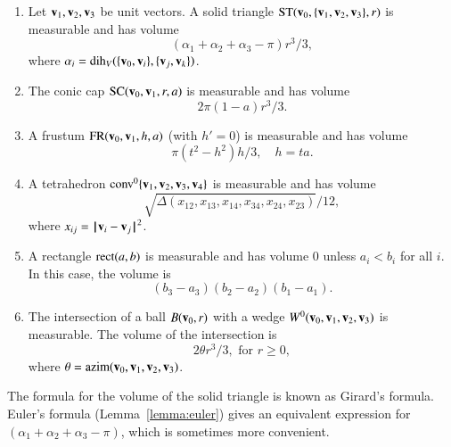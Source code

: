 \begin{lemma} 
\begin{enumerate} 
 \item {} Let ${\mathbf v}_1,{\mathbf v}_2,{\mathbf v}_3$ be unit vectors.
   A solid triangle ${\operatorname{ST}}({\mathbf v}_0,\{{\mathbf v}_1,{\mathbf v}_2,{\mathbf v}_3\},r)$ is measurable and has volume
   \begin{displaymath}
   (\alpha_1+\alpha_2+\alpha_3-\pi)r^3/3,
   \end{displaymath}
   where $\alpha_i = \operatorname{dih}_V(\{{\mathbf v}_0,{\mathbf v}_i\},\{{\mathbf v}_j,{\mathbf v}_k\})$.
  \item {} The conic cap ${\operatorname{SC}}({\mathbf v}_0,{\mathbf v}_1,r,a)$ is measurable and has volume
   \begin{displaymath}
    2\pi(1-a) r^3/3.
   \end{displaymath}
 \item {} A frustum ${\operatorname{FR}}({\mathbf v}_0,{\mathbf v}_1,h,a)$ (with $h'=0$) 
is measurable and has volume
   \begin{displaymath}
   \pi (t^2-h^2) h/3,\quad h = t a.
   \end{displaymath}
 \item{} A tetrahedron ${\operatorname{conv}}^0\{{\mathbf v}_1,{\mathbf v}_2,{\mathbf v}_3,{\mathbf v}_4\}$ is measurable and has volume
   \begin{displaymath}
   \sqrt{\Delta(x_{12},x_{13},x_{14},x_{34},x_{24},x_{23})}/12,
   \end{displaymath}
   where $x_{ij} = {\hskip0.1em|\hskip-0.15em|\hskip0.1em}{\mathbf v}_i - {\mathbf v}_j{\hskip0.1em|\hskip-0.15em|\hskip0.1em}^2$.
\item{} A rectangle ${\operatorname{rect}}(a,b)$ is measurable and
has volume $0$ unless $a_i<b_i$ for all $i$.  In this case, the
volume is
\begin{displaymath}(b_3-a_3)(b_2-a_2)(b_1-a_1).\end{displaymath}
 \item{} The intersection of a ball $B({\mathbf v}_0,r)$ with a wedge
 $W^0({\mathbf v}_0,{\mathbf v}_1,{\mathbf v}_2,{\mathbf v}_3)$ is measurable.  The volume of the intersection
is 
   \begin{displaymath}
   2 \theta r^3/3,\text{ for } r \ge 0,
   \end{displaymath}
where $\theta = {\operatorname{azim}}({\mathbf v}_0,{\mathbf v}_1,{\mathbf v}_2,{\mathbf v}_3)$.

\end{enumerate}
\end{lemma}

The formula for the volume of the solid triangle is known as Girard's formula.
Euler's formula (Lemma~\ref{lemma:euler}) gives an
equivalent expression for $(\alpha_1+\alpha_2+\alpha_3-\pi)$, which is sometimes more convenient.
%
%

